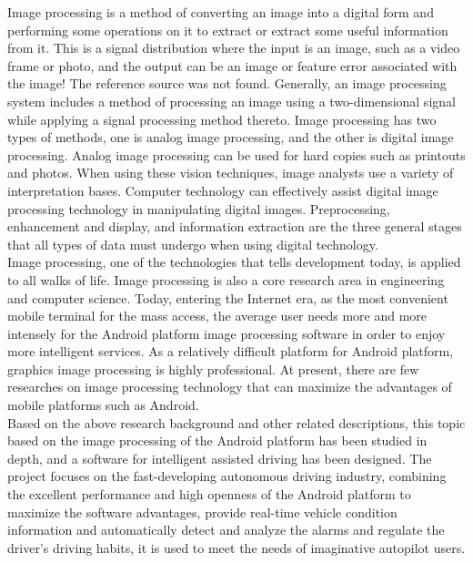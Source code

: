 \documentclass[12pt, a4paper]{article}
\begin{document}
Image processing is a method of converting an image into a digital form and performing some operations on it to extract or extract some useful information from it. This is a signal distribution where the input is an image, such as a video frame or photo, and the output can be an image or feature error associated with the image! The reference source was not found. Generally, an image processing system includes a method of processing an image using a two-dimensional signal while applying a signal processing method thereto. Image processing has two types of methods, one is analog image processing, and the other is digital image processing. Analog image processing can be used for hard copies such as printouts and photos. When using these vision techniques, image analysts use a variety of interpretation bases. Computer technology can effectively assist digital image processing technology in manipulating digital images. Preprocessing, enhancement and display, and information extraction are the three general stages that all types of data must undergo when using digital technology.\\Image processing, one of the technologies that tells development today, is applied to all walks of life. Image processing is also a core research area in engineering and computer science. Today, entering the Internet era, as the most convenient mobile terminal for the mass access, the average user needs more and more intensely for the Android platform image processing software in order to enjoy more intelligent services. As a relatively difficult platform for Android platform, graphics image processing is highly professional. At present, there are few researches on image processing technology that can maximize the advantages of mobile platforms such as Android.\\Based on the above research background and other related descriptions, this topic based on the image processing of the Android platform has been studied in depth, and a software for intelligent assisted driving has been designed. The project focuses on the fast-developing autonomous driving industry, combining the excellent performance and high openness of the Android platform to maximize the software advantages, provide real-time vehicle condition information and automatically detect and analyze the alarms and regulate the driver's driving habits, it is used to meet the needs of imaginative autopilot users.
\end{document}
